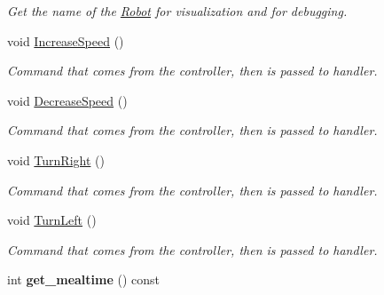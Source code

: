 \begin{DoxyCompactItemize}
\begin{DoxyCompactList}\small\item\em Get the name of the \mbox{\hyperlink{class_robot}{Robot}} for visualization and for debugging. \end{DoxyCompactList}\item 
\mbox{\label{class_robot_ae4647cccd002ca13659017e634237ead}} 
void \mbox{\hyperlink{class_robot_ae4647cccd002ca13659017e634237ead}{Increase\+Speed}} ()
\begin{DoxyCompactList}\small\item\em Command that comes from the controller, then is passed to handler. \end{DoxyCompactList}\item 
\mbox{\label{class_robot_a94afa6f63eb22667261c07933faae481}} 
void \mbox{\hyperlink{class_robot_a94afa6f63eb22667261c07933faae481}{Decrease\+Speed}} ()
\begin{DoxyCompactList}\small\item\em Command that comes from the controller, then is passed to handler. \end{DoxyCompactList}\item 
\mbox{\label{class_robot_a12b5883779f682c66e71bc54b6539694}} 
void \mbox{\hyperlink{class_robot_a12b5883779f682c66e71bc54b6539694}{Turn\+Right}} ()
\begin{DoxyCompactList}\small\item\em Command that comes from the controller, then is passed to handler. \end{DoxyCompactList}\item 
\mbox{\label{class_robot_ad864d21d997dbadf55f997c2f0143d41}} 
void \mbox{\hyperlink{class_robot_ad864d21d997dbadf55f997c2f0143d41}{Turn\+Left}} ()
\begin{DoxyCompactList}\small\item\em Command that comes from the controller, then is passed to handler. \end{DoxyCompactList}\item 
\mbox{\label{class_robot_a66f5b5fd1597fa164a5ebaf096a5eaf1}} 
int {\bfseries get\+\_\+mealtime} () const
\item 
\mbox{\label{class_robot_a14ac367e3b1c270c31b769accdf1663c}} 

\end{DoxyCompactItemize}
